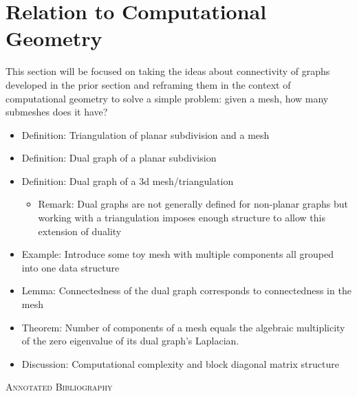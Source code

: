 \documentclass{article}
\begin{document}
\section{Relation to Computational Geometry}

This section will be focused on taking the ideas about connectivity of graphs developed in the prior section and reframing them in the context of computational geometry to solve a simple problem: given a mesh, how many submeshes does it have?

\begin{itemize}
    \item Definition: Triangulation of planar subdivision and a mesh
    \item Definition: Dual graph of a planar subdivision
    \item Definition: Dual graph of a 3d mesh/triangulation
        \begin{itemize}
            \item Remark: Dual graphs are not generally defined for non-planar graphs but working with a triangulation imposes enough structure to allow this extension of duality
        \end{itemize}
    \item Example: Introduce some toy mesh with multiple components all grouped into one data structure
    \item Lemma: Connectedness of the dual graph corresponds to connectedness in the mesh
    \item Theorem: Number of components of a mesh equals the algebraic multiplicity of the zero eigenvalue of its dual graph's Laplacian.
    \item Discussion: Computational complexity and block diagonal matrix structure
\end{itemize}

\begin{center}\textsc{\Large Annotated Bibliography}\end{center}
\end{document}
